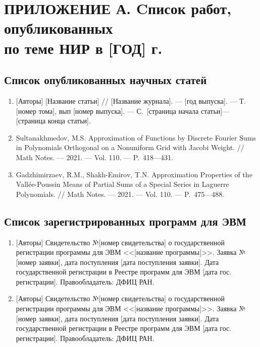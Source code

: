 \chapter{ПРИЛОЖЕНИЕ А. Cписок работ, опубликованных \texorpdfstring{\\ }{} по теме НИР в [ГОД] г.}


\section*{Список опубликованных научных статей}

\begin{enumerate}[1]
    \item
    {[Авторы]}
    [Название статьи]
    //
    [Название журнала].
    --- [год выпуска].
    --- Т. [номер тома], вып [номер выпуска].
    --- С.~[страница начала статьи]---[страница конца статьи].

    \item
    \foreignlanguage{english}{%
        Sultanakhmedov, M.S.
        Approximation of Functions by Discrete Fourier Sums in Polynomials Orthogonal on a Nonuniform Grid with Jacobi Weight.
        //
        Math Notes. 
        --- 2021.
        --- Vol. 110.
        --- P.~418---431.
    }%

    \item
    \foreignlanguage{english}{%
        Gadzhimirzaev, R.M., Shakh-Emirov, T.N.
        Approximation Properties of the Vallée-Pous\-sin Means of Partial Sums of a Special Series in Laguerre Polynomials.
        //
        Math Notes. 
        --- 2021.
        --- Vol. 110.
        --- P.~475---488.
    }%

\end{enumerate}

\section*{Список зарегистрированных программ для ЭВМ}

\begin{enumerate}[1]

    \item
    {[Авторы]} Свидетельство №[номер свидетельства] о государственной регистрации программы для ЭВМ <<[название программы]>>. Заявка №[номер заявки], дата поступления [дата поступления заявки]. Дата государственной регистрации в Реестре программ для ЭВМ [дата гос. регистрации]. Правообладатель: ДФИЦ РАН.

    \item
    {[Авторы]} Свидетельство №[номер свидетельства] о государственной регистрации программы для ЭВМ <<[название программы]>>. Заявка №[номер заявки], дата поступления [дата поступления заявки]. Дата государственной регистрации в Реестре программ для ЭВМ [дата гос. регистрации]. Правообладатель: ДФИЦ РАН.

\end{enumerate}
